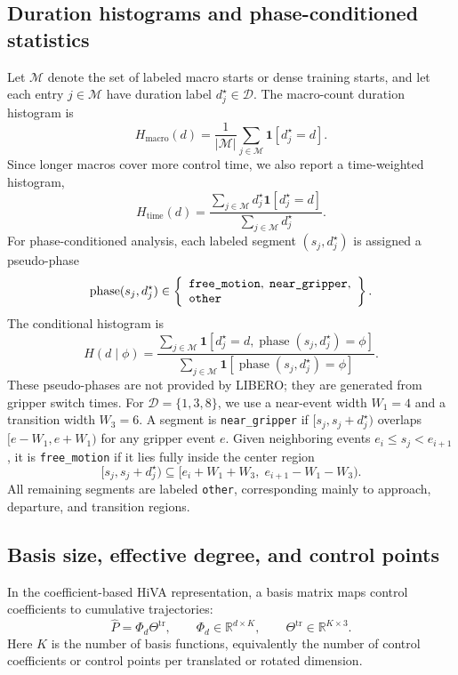 \documentclass[10pt,twocolumn,letterpaper]{article}
\begin{document}
\subsection{Duration histograms and phase-conditioned statistics}
\label{app:histograms}
Let $\mathcal{M}$ denote the set of labeled macro starts or dense training starts, and let each entry $j\in\mathcal{M}$ have duration label $d_j^{\star}\in\mathcal{D}$. The macro-count duration histogram is
\begin{equation}
H_{\mathrm{macro}}(d)=
\frac{1}{|\mathcal{M}|}
\sum_{j\in\mathcal{M}}\mathbf{1}[d_j^{\star}=d].
\end{equation}
Since longer macros cover more control time, we also report a time-weighted histogram,
\begin{equation}
H_{\mathrm{time}}(d)=
\frac{\sum_{j\in\mathcal{M}}d_j^{\star}\mathbf{1}[d_j^{\star}=d]}
{\sum_{j\in\mathcal{M}}d_j^{\star}}.
\end{equation}
For phase-conditioned analysis, each labeled segment $(s_j,d_j^{\star})$ is assigned a pseudo-phase
\begin{equation}
\operatorname{phase}(s_j,d_j^{\star})\in
\left\{
\begin{array}{l}
\text{\texttt{free\_motion}},\;
\text{\texttt{near\_gripper}},\\
\text{\texttt{other}}
\end{array}
\right\}.
\end{equation}
The conditional histogram is
\begin{equation}
H(d\mid \phi)=
\frac{\sum_{j\in\mathcal{M}}\mathbf{1}[d_j^{\star}=d,
\operatorname{phase}(s_j,d_j^{\star})=\phi]}
{\sum_{j\in\mathcal{M}}\mathbf{1}[\operatorname{phase}(s_j,d_j^{\star})=\phi]}.
\end{equation}
These pseudo-phases are not provided by LIBERO; they are generated from gripper switch times. For $\mathcal{D}=\{1,3,8\}$, we use a near-event width $W_1=4$ and a transition width $W_3=6$. A segment is \texttt{near\_gripper} if $[s_j,s_j+d_j^{\star})$ overlaps $[e-W_1,e+W_1)$ for any gripper event $e$. Given neighboring events $e_i\le s_j<e_{i+1}$, it is \texttt{free\_motion} if it lies fully inside the center region
\begin{equation}
[s_j,s_j+d_j^{\star})\subseteq
[e_i+W_1+W_3,\; e_{i+1}-W_1-W_3).
\end{equation}
All remaining segments are labeled \texttt{other}, corresponding mainly to approach, departure, and transition regions.

\subsection{Basis size, effective degree, and control points}
\label{app:keff}
In the coefficient-based HiVA representation, a basis matrix maps control coefficients to cumulative trajectories:
\begin{equation}
\hat P=\Phi_d\Theta^{\mathrm{tr}},
\qquad
\Phi_d\in\mathbb{R}^{d\times K},
\qquad
\Theta^{\mathrm{tr}}\in\mathbb{R}^{K\times 3}.
\end{equation}
Here $K$ is the number of basis functions, equivalently the number of control coefficients or control points per translated or rotated dimension.
\end{document}
